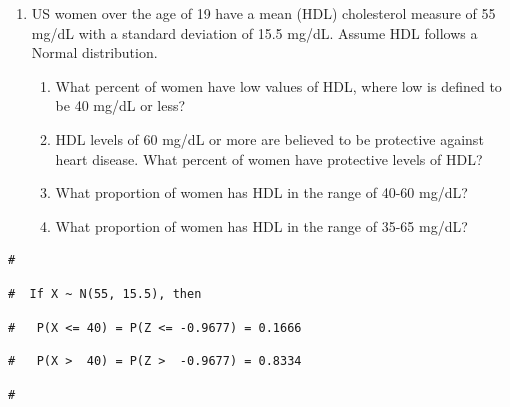 \documentclass[letterpaper,12pt,twoside,]{pinp}
\providecommand{\tightlist}{%
  \setlength{\itemsep}{0pt}\setlength{\parskip}{0pt}}
\begin{document}
\begin{enumerate}
\def\labelenumi{\alph{enumi}.}
\tightlist
\item
  US women over the age of 19 have a mean (HDL) cholesterol measure of
  55 mg/dL with a standard deviation of 15.5 mg/dL. Assume HDL follows a
  Normal distribution.

  \begin{enumerate}
  \def\labelenumii{\roman{enumii}.}
  \tightlist
  \item
    What percent of women have low values of HDL, where low is defined
    to be 40 mg/dL or less?
  \item
    HDL levels of 60 mg/dL or more are believed to be protective against
    heart disease. What percent of women have protective levels of HDL?
  \item
    What proportion of women has HDL in the range of 40-60 mg/dL?
  \item
    What proportion of women has HDL in the range of 35-65 mg/dL?
  \end{enumerate}
\end{enumerate}

\begin{Shaded}
\begin{Highlighting}[]
\OperatorTok{::}\NormalTok{(} \NormalTok{, } \NormalTok{, } \NormalTok{)}
\end{Highlighting}
\end{Shaded}

\begin{ShadedResult}
\begin{verbatim}
#  
\end{verbatim}
\end{ShadedResult}
\begin{ShadedResult}
\begin{verbatim}
#  If X ~ N(55, 15.5), then
\end{verbatim}
\end{ShadedResult}
\begin{ShadedResult}
\begin{verbatim}
#   P(X <= 40) = P(Z <= -0.9677) = 0.1666
\end{verbatim}
\end{ShadedResult}
\begin{ShadedResult}
\begin{verbatim}
#   P(X >  40) = P(Z >  -0.9677) = 0.8334
\end{verbatim}
\end{ShadedResult}
\begin{ShadedResult}
\begin{verbatim}
#  
\end{verbatim}
\end{ShadedResult}
\end{document}
